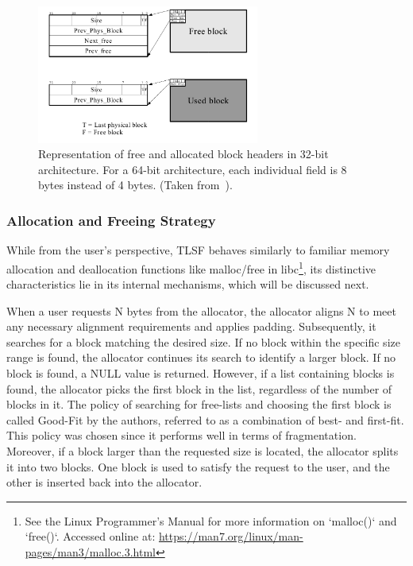 
\begin{figure}[H]
    \centering
    \includegraphics[width=0.65\textwidth]{figures/blockheader_reference.png}
    \caption{Representation of free and allocated block headers in 32-bit architecture. For a 64-bit architecture, each individual field is 8 bytes instead of 4 bytes. (Taken from~\cite{TLSF}).}
    \label{fig:blockheader_reference}
\end{figure}

\subsubsection{Allocation and Freeing Strategy}

While from the user's perspective, TLSF behaves similarly to familiar memory allocation and deallocation functions like malloc/free in libc\footnote{See the Linux Programmer's Manual for more information on `malloc()` and `free()`. Accessed online at: \url{https://man7.org/linux/man-pages/man3/malloc.3.html}}, its distinctive characteristics lie in its internal mechanisms, which will be discussed next.

When a user requests N bytes from the allocator, the allocator aligns N to meet any necessary alignment requirements and applies padding. Subsequently, it searches for a block matching the desired size. If no block within the specific size range is found, the allocator continues its search to identify a larger block. If no block is found, a NULL value is returned. However, if a list containing blocks is found, the allocator picks the first block in the list, regardless of the number of blocks in it. The policy of searching for free-lists and choosing the first block is called Good-Fit by the authors, referred to as a combination of best- and first-fit. This policy was chosen since it performs well in terms of fragmentation. Moreover, if a block larger than the requested size is located, the allocator splits it into two blocks. One block is used to satisfy the request to the user, and the other is inserted back into the allocator.

